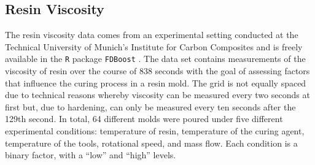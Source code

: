 \documentclass[12pt]{article}
\theoremstyle{plain}
\theoremstyle{remark}
\begin{document}


\subsection{Resin Viscosity}

The resin viscosity data comes from an experimental setting conducted at the Technical University of Munich's Institute for Carbon Composites and is freely available in the \texttt{R} package \texttt{FDBoost} \citep{FDboost2020}. The data set contains measurements of the viscosity of resin over the course of 838 seconds with the goal of assessing factors that influence the curing process in a resin mold. The grid is not equally spaced due to technical reasons whereby viscosity can be measured every two seconds at first but, due to hardening, can only be measured every ten seconds after the 129th second. In total, 64 different molds were poured under five different experimental conditions: temperature of resin, temperature of the curing agent, temperature of the tools, rotational speed, and mass flow. Each condition is a binary factor, with a ``low'' and ``high'' levels.
\end{document}
